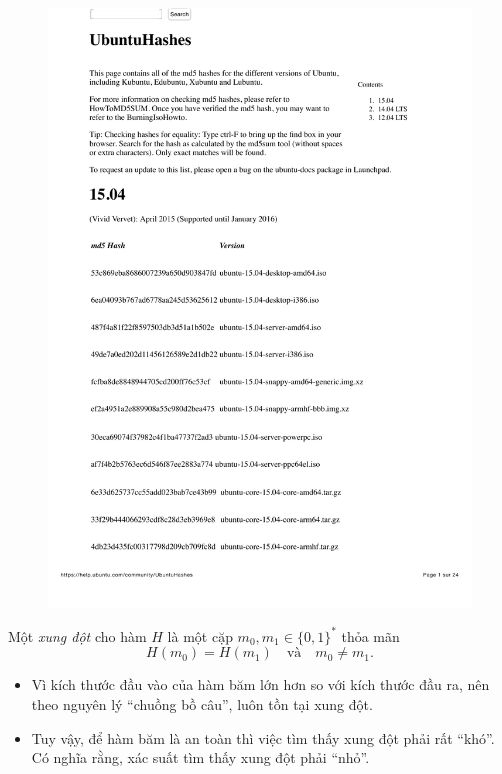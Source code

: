 \begin{frame}
	\begin{block}{}
		\begin{figure}[h]
		  \centering
		    \includegraphics[width=.8\textwidth]{hashUbuntu.pdf}
		\end{figure}
		
	\end{block}
	
\end{frame}

\begin{frame}
	\begin{dfntn}
	  Một \textit{xung đột} cho hàm  $H$ là một cặp $m_0, m_1 \in
	  \{0,1\}^*$ thỏa mãn
	  \[
	  H(m_0) = H(m_1) \quad \text{và}\quad m_0 \not = m_1.
	  \]
	\end{dfntn}
	\begin{itemize}
		\item 	Vì kích thước đầu vào của hàm băm lớn hơn so với kích thước đầu ra, nên theo nguyên lý ``chuồng bồ câu'', luôn tồn tại xung đột. 
		\item Tuy vậy, để hàm băm là an toàn  thì việc tìm thấy xung đột phải  rất ``khó''. Có nghĩa rằng, xác suất tìm thấy xung đột phải ``nhỏ''. 
	\end{itemize}
\end{frame}

